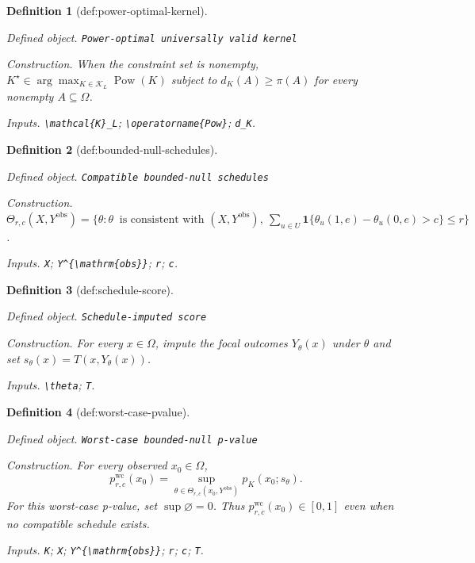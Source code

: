 \documentclass{article}
\newtheorem{definition}{Definition}
\begin{document}
\begin{definition}[def:power-optimal-kernel]\label{def:power-optimal-kernel}
\par\smallskip\noindent\emph{Defined object.} \texttt{Power-\allowbreak{}optimal universally valid kernel}
\par\smallskip\noindent\emph{Construction.} When the constraint set is nonempty, \(K^{\star}\in\arg\max_{K\in\mathcal{K}_L}\operatorname{Pow}(K)\) subject to \(d_K(A)\geq\pi(A)\) for every nonempty \(A\subseteq\Omega\).
\par\smallskip\noindent\emph{Inputs.} \texttt{\textbackslash{}\allowbreak{}mathcal\{K\}\allowbreak{}\_\allowbreak{}L}; \texttt{\textbackslash{}\allowbreak{}operatorname\{Pow\}\allowbreak{}}; \texttt{d\_\allowbreak{}K}.
\end{definition}

\begin{definition}[def:bounded-null-schedules]\label{def:bounded-null-schedules}
\par\smallskip\noindent\emph{Defined object.} \texttt{Compatible bounded-\allowbreak{}null schedules}
\par\smallskip\noindent\emph{Construction.} \(\Theta_{r,c}(X,Y^{\mathrm{obs}})=\{\theta: \theta\ \text{ is consistent with }(X,Y^{\mathrm{obs}}),\ \sum_{u\in U}\mathbf{1}\{\theta_u(1,e)-\theta_u(0,e)>c\}\leq r\}\).
\par\smallskip\noindent\emph{Inputs.} \texttt{X}; \texttt{Y\textasciicircum{}\{\textbackslash{}\allowbreak{}mathrm\{obs\}\allowbreak{}\}\allowbreak{}}; \texttt{r}; \texttt{c}.
\end{definition}

\begin{definition}[def:schedule-score]\label{def:schedule-score}
\par\smallskip\noindent\emph{Defined object.} \texttt{Schedule-\allowbreak{}imputed score}
\par\smallskip\noindent\emph{Construction.} For every \(x\in\Omega\), impute the focal outcomes \(Y_{\theta}(x)\) under \(\theta\) and set \(s_{\theta}(x)=T(x,Y_{\theta}(x))\).
\par\smallskip\noindent\emph{Inputs.} \texttt{\textbackslash{}\allowbreak{}theta}; \texttt{T}.
\end{definition}

\begin{definition}[def:worst-case-pvalue]\label{def:worst-case-pvalue}
\par\smallskip\noindent\emph{Defined object.} \texttt{Worst-\allowbreak{}case bounded-\allowbreak{}null p-\allowbreak{}value}
\par\smallskip\noindent\emph{Construction.} For every observed \(x_0\in\Omega\),
\[
p^{\mathrm{wc}}_{r,c}(x_0)
=\sup_{\theta\in\Theta_{r,c}(x_0,Y^{\mathrm{obs}})}
p_K(x_0;s_{\theta}).
\]
For this worst-case p-value, set \(\sup\varnothing=0\).  Thus
\(p^{\mathrm{wc}}_{r,c}(x_0)\in[0,1]\) even when no compatible schedule
exists.
\par\smallskip\noindent\emph{Inputs.} \texttt{K}; \texttt{X}; \texttt{Y\textasciicircum{}\{\textbackslash{}\allowbreak{}mathrm\{obs\}\allowbreak{}\}\allowbreak{}}; \texttt{r}; \texttt{c}; \texttt{T}.
\end{definition}
\end{document}
